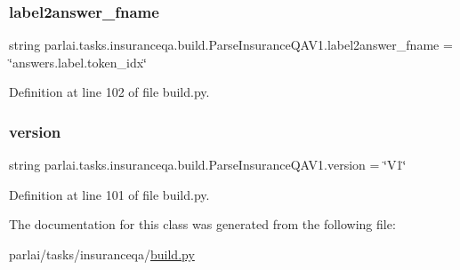 \subsubsection{\texorpdfstring{label2answer\+\_\+fname}{label2answer\_fname}}
{\footnotesize\ttfamily string parlai.\+tasks.\+insuranceqa.\+build.\+Parse\+Insurance\+Q\+A\+V1.\+label2answer\+\_\+fname = \char`\"{}answers.\+label.\+token\+\_\+idx\char`\"{}\hspace{0.3cm}{\ttfamily [static]}}



Definition at line 102 of file build.\+py.

\mbox{\label{classparlai_1_1tasks_1_1insuranceqa_1_1build_1_1ParseInsuranceQAV1_a2c80c19256c2c59a2c29ffc88e125165}} 
\subsubsection{\texorpdfstring{version}{version}}
{\footnotesize\ttfamily string parlai.\+tasks.\+insuranceqa.\+build.\+Parse\+Insurance\+Q\+A\+V1.\+version = \char`\"{}V1\char`\"{}\hspace{0.3cm}{\ttfamily [static]}}



Definition at line 101 of file build.\+py.



The documentation for this class was generated from the following file\+:\begin{DoxyCompactItemize}
\item 
parlai/tasks/insuranceqa/\hyperlink{parlai_2tasks_2insuranceqa_2build_8py}{build.\+py}\end{DoxyCompactItemize}
